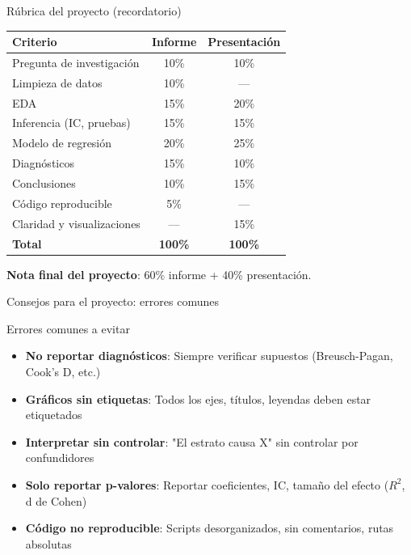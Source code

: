 \documentclass[aspectratio=169, 11pt]{beamer}
\begin{document}
\begin{frame}{Rúbrica del proyecto (recordatorio)}
\small
\begin{center}
\renewcommand{\arraystretch}{1.3}
\begin{tabular}{lcc}
\toprule
\textbf{Criterio} & \textbf{Informe} & \textbf{Presentación} \\
\midrule
Pregunta de investigación & 10\% & 10\% \\
Limpieza de datos & 10\% & — \\
EDA & 15\% & 20\% \\
Inferencia (IC, pruebas) & 15\% & 15\% \\
Modelo de regresión & 20\% & 25\% \\
Diagnósticos & 15\% & 10\% \\
Conclusiones & 10\% & 15\% \\
Código reproducible & 5\% & — \\
Claridad y visualizaciones & — & 15\% \\
\midrule
\textbf{Total} & \textbf{100\%} & \textbf{100\%} \\
\bottomrule
\end{tabular}
\end{center}

\vspace{0.2cm}
\textbf{Nota final del proyecto}: 60\% informe + 40\% presentación.
\end{frame}

\begin{frame}{Consejos para el proyecto: errores comunes}
\begin{alertblock}{Errores comunes a evitar}
\begin{itemize}
\item \textbf{No reportar diagnósticos}: Siempre verificar supuestos (Breusch-Pagan, Cook's D, etc.)
\item \textbf{Gráficos sin etiquetas}: Todos los ejes, títulos, leyendas deben estar etiquetados
\item \textbf{Interpretar sin controlar}: "El estrato causa X" sin controlar por confundidores
\item \textbf{Solo reportar p-valores}: Reportar coeficientes, IC, tamaño del efecto ($R^2$, d de Cohen)
\item \textbf{Código no reproducible}: Scripts desorganizados, sin comentarios, rutas absolutas
\end{itemize}
\end{alertblock}
\end{frame}
\end{document}
